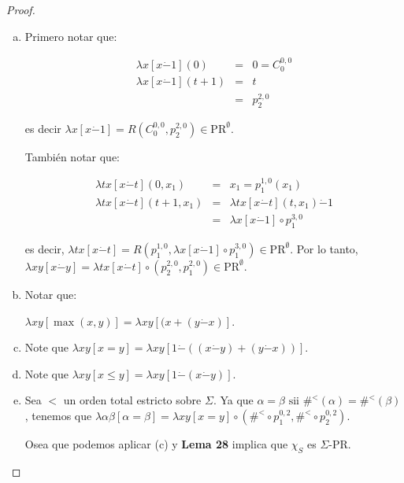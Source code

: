   \begin{proof}
    \begin{enumerate}[a)]
      \item Primero notar que:

        \begin{eqnarray}
          \nonumber \lambda x \left[x \dot{-}1\right](0) &=& 0 = C_{0}^{0,0} \\
          \nonumber \lambda x \left[x \dot{-}1\right](t+1) &=& t \\
          \nonumber &=& p_{2}^{2,0}
        \end{eqnarray}

        \par es decir $\lambda x \left[x \dot{-}1\right] = R(C_{0}^{0,0}, p_{2}^{2,0}) \in \mathrm{PR}^{\emptyset}$.
        \par También notar que:

        \begin{eqnarray}
          \nonumber \lambda tx \left[x \dot{-}t\right](0, x_{1}) &=& x_{1} = p_{1}^{1,0}(x_{1}) \\
          \nonumber \lambda tx \left[x \dot{-}t\right](t+1, x_{1}) &=& \lambda tx \left[x \dot{-}t\right](t, x_{1})
            \dot{-} 1\\
          \nonumber &=& \lambda x \left[x \dot{-}1\right] \circ p_{1}^{3,0}
        \end{eqnarray}

        \par es decir, $\lambda tx \left[x \dot{-}t\right] = R(p_{1}^{1, 0}, \lambda x \left[x \dot{-}1\right] \circ
        p_{1}^{3, 0}) \in \mathrm{PR}^{\emptyset}$. Por lo tanto, $\lambda xy \left[x \dot{-}y\right] = \lambda tx
        \left[x \dot{-}t\right] \circ (p_{2}^{2, 0}, p_{1}^{2, 0}) \in \mathrm{PR}^{\emptyset}$.
      \item Notar que:


       $\lambda xy \left[\max (x,y)\right] = \lambda xy \left[(x + (y \dot{-}x)\right]$.
      \item Note que $\lambda xy \left[x = y\right] = \lambda xy \left[1 \dot{-}((x \dot{-} y) + (y \dot{-} x))\right]$.
      \item Note que $\lambda xy \left[x \leq y\right] = \lambda xy\left[1 \dot{-}(x \dot{-}y)\right]$.
      \item Sea $<$ un orden total estricto sobre $\Sigma$. Ya que $\alpha = \beta \text{ sii } \#^{<}(\alpha) =
        \#^{<}(\beta)$, tenemos que $\lambda \alpha \beta \left[\alpha = \beta\right] = \lambda xy \left[x = y\right]
        \circ (\#^{<} \circ p_{1}^{0, 2}, \#^{<} \circ p_{2}^{0, 2})$.

        \par Osea que podemos aplicar (c) y \textbf{Lema 28} implica que $\chi_{S}$ es $\Sigma$-PR.
    \end{enumerate}
  \end{proof}

